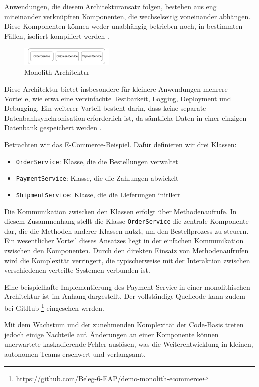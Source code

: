 \documentclass[acmtog]{acmart}
\begin{document}
Anwendungen, die diesem Architekturansatz folgen, bestehen aus eng miteinander verknüpften
Komponenten, die wechselseitig voneinander abhängen.
Diese Komponenten können weder unabhängig betrieben noch, in bestimmten Fällen,
isoliert kompiliert werden \cite[485]{mono3}.

\begin{figure}[h!]
    \centering
    \includegraphics[width=0.4\textwidth]{images/mono/mono.pdf}
    \caption{Monolith Architektur}
    \label{fig:mono}
\end{figure}

Diese Architektur bietet insbesondere für kleinere Anwendungen mehrere Vorteile,
wie etwa eine vereinfachte Testbarkeit, Logging, Deployment und Debugging. Ein
weiterer Vorteil besteht darin, dass keine separate Datenbanksynchronisation
erforderlich ist, da sämtliche Daten in einer einzigen Datenbank gespeichert
werden \cite[2]{mono4}.

Betrachten wir das E-Commerce-Beispiel.
Dafür definieren wir drei Klassen:
\begin{itemize}
    \item \texttt{OrderService}: Klasse, die die Bestellungen verwaltet
    \item \texttt{PaymentService}: Klasse, die die Zahlungen abwickelt
    \item \texttt{ShipmentService}: Klasse, die die Lieferungen initiiert
\end{itemize}

Die Kommunikation zwischen den Klassen erfolgt über Methodenaufrufe. In diesem
Zusammenhang stellt die Klasse \texttt{OrderService} die zentrale Komponente dar,
die die Methoden anderer Klassen nutzt, um den Bestellprozess zu steuern. Ein
wesentlicher Vorteil dieses Ansatzes liegt in der einfachen Kommunikation
zwischen den Komponenten.
Durch den direkten Einsatz von Methodenaufrufen
wird die Komplexität verringert, die typischerweise mit der Interaktion zwischen
verschiedenen verteilte Systemen verbunden ist.

Eine beispielhafte Implementierung des Payment-Service in einer monolithischen
Architektur ist im Anhang dargestellt.
Der vollständige Quellcode kann zudem bei GitHub
\footnote{https://github.com/Beleg-6-EAP/demo-monolith-ecommerce} eingesehen werden.

Mit dem Wachstum und der zunehmenden Komplexität der Code-Basis treten jedoch
einige Nachteile auf.
Änderungen an einer Komponente können unerwartete kaskadierende
Fehler auslösen, was die Weiterentwicklung in kleinen, autonomen Teams erschwert
und verlangsamt.
\end{document}
